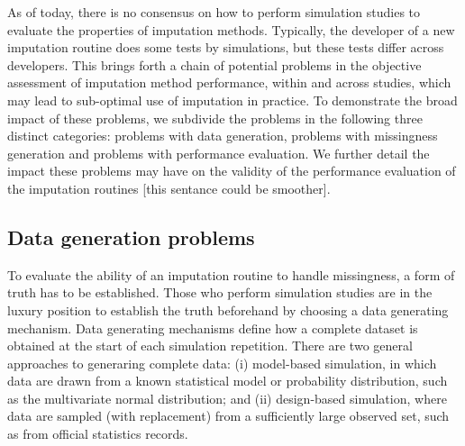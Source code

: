 \documentclass[bimj,fleqn]{w-art}
\theoremstyle{plain}
\theoremstyle{definition}
\begin{document}
As of today, there is no consensus on how to perform simulation studies to evaluate the properties of imputation methods. Typically, the developer of a new imputation routine does some tests by simulations, but these tests differ across developers. This brings forth a chain of potential problems in the objective assessment of imputation method performance, within and across studies, which may lead to sub-optimal use of imputation in practice. To demonstrate the broad impact of these problems, we subdivide the problems in the following three distinct categories: problems with data generation, problems with missingness generation and problems with performance evaluation. We further detail the impact these problems may have on the validity of the performance evaluation of the imputation routines [this sentance could be smoother]. 


\subsection{Data generation problems}

To evaluate the ability of an imputation routine to handle missingness, a form of truth has to be established. Those who perform simulation studies are in the luxury position to establish the truth beforehand by choosing a data generating mechanism. Data generating mechanisms define how a complete dataset is obtained at the start of each simulation repetition. There are two general approaches to generaring complete data: (i) model-based simulation, in which data are drawn from a known statistical model or probability distribution, such as the multivariate normal distribution; and (ii) design-based simulation, where data are sampled (with replacement) from a sufficiently large observed set, such as from official statistics records.
\end{document}
